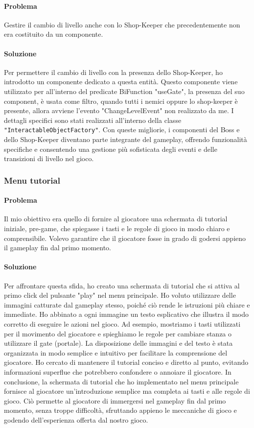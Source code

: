 \documentclass[a4paper,12pt]{report}
\begin{document}
\paragraph*{Problema}
Gestire il cambio di livello anche con lo Shop-Keeper che precedentemente non era costituito da un componente.
\paragraph*{Soluzione}
Per permettere il cambio di livello con la presenza dello Shop-Keeper, ho introdotto un componente dedicato a questa entità.
Questo componente viene utilizzato per all'interno del predicate BiFunction "useGate", la presenza del suo component, è usata come filtro, quando tutti i nemici oppure lo shop-keeper è presente, allora avviene l'evento "ChangeLevelEvent" non realizzato da me.
I dettagli specifici sono stati realizzati all'interno della classe \texttt{"InteractableObjectFactory"}.
Con queste migliorie, i componenti del Boss e dello Shop-Keeper diventano parte integrante del gameplay, offrendo funzionalità specifiche e consentendo una gestione più sofisticata degli eventi e delle transizioni di livello nel gioco.
\subsubsection*{Menu tutorial}
\paragraph*{Problema}
Il mio obiettivo era quello di fornire al giocatore una schermata di tutorial iniziale, pre-game, che spiegasse i tasti e le regole di gioco in modo chiaro e comprensibile. 
Volevo garantire che il giocatore fosse in grado di godersi appieno il gameplay fin dal primo momento.
\paragraph*{Soluzione}
Per affrontare questa sfida, ho creato una schermata di tutorial che si attiva al primo click del pulsante "play" nel menu principale. 
Ho voluto utilizzare delle immagini catturate dal gameplay stesso, poiché ciò rende le istruzioni più chiare e immediate.
Ho abbinato a ogni immagine un testo esplicativo che illustra il modo corretto di eseguire le azioni nel gioco.
Ad esempio, mostriamo i tasti utilizzati per il movimento del giocatore e spieghiamo le regole per cambiare stanza o utilizzare il gate (portale).
La disposizione delle immagini e del testo è stata organizzata in modo semplice e intuitivo per facilitare la comprensione del giocatore.
Ho cercato di mantenere il tutorial conciso e diretto al punto, evitando informazioni superflue che potrebbero confondere o annoiare il giocatore.
In conclusione, la schermata di tutorial che ho implementato nel menu principale fornisce al giocatore un'introduzione semplice ma completa ai tasti e alle regole di gioco.
Ciò permette al giocatore di immergersi nel gameplay fin dal primo momento, senza troppe difficoltà, sfruttando appieno le meccaniche di gioco e godendo dell'esperienza offerta dal nostro gioco.
\end{document}
